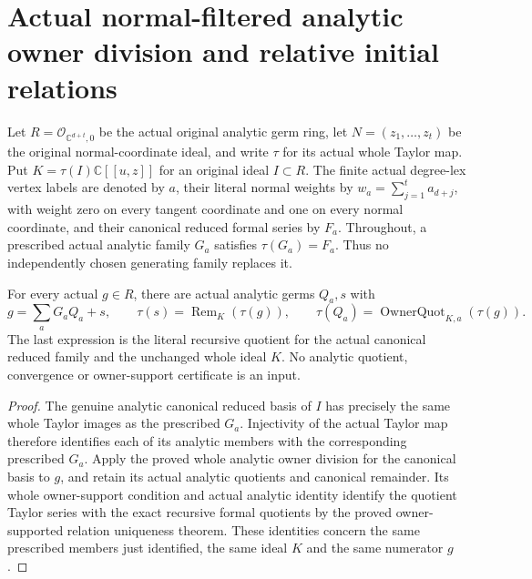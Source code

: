 \section{Actual normal-filtered analytic owner division and relative initial relations}

Let $R=\mathcal O_{\mathbb C^{d+t},0}$ be the actual original analytic
germ ring, let $N=(z_1,\ldots,z_t)$ be the original normal-coordinate
ideal, and write $\tau$ for its actual whole Taylor map. Put
$K=\tau(I)\mathbb C[[u,z]]$ for an original ideal $I\subset R$.
The finite actual degree-lex vertex labels are denoted by $a$, their
literal normal weights by $w_a=\sum_{j=1}^t a_{d+j}$, with weight
zero on every tangent coordinate and one on every normal coordinate,
and their canonical reduced formal series by
$F_a$. Throughout, a prescribed actual analytic family $G_a$ satisfies
$\tau(G_a)=F_a$. Thus no independently chosen generating family replaces it.

\begin{theorem}
\label{hir:actual-prescribed-canonical-analytic-owner-division}
\leanok
For every actual $g\in R$, there are actual analytic germs $Q_a,s$ with
\[
 g=\sum_aG_aQ_a+s,\qquad
 \tau(s)=\operatorname{Rem}_K(\tau(g)),\qquad
 \tau(Q_a)=\operatorname{OwnerQuot}_{K,a}(\tau(g)).
\]
The last expression is the literal recursive quotient for the actual
canonical reduced family and the unchanged whole ideal $K$.
No analytic quotient, convergence or owner-support certificate is an input.
\end{theorem}
\begin{proof}
The genuine analytic canonical reduced basis of $I$ has precisely the
same whole Taylor images as the prescribed $G_a$. Injectivity of the
actual Taylor map therefore identifies each of its analytic members
with the corresponding prescribed $G_a$. Apply the proved whole analytic
owner division for the canonical basis to $g$, and retain its actual
analytic quotients and canonical remainder. Its whole owner-support
condition and actual analytic identity identify the quotient Taylor
series with the exact recursive formal quotients by the proved
owner-supported relation uniqueness theorem. These identities concern
the same prescribed members just identified, the same ideal $K$ and
the same numerator $g$.
\end{proof}

